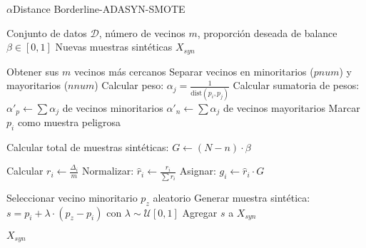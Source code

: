 \begin{algorithm}[H]
\caption{$\alpha$Distance Borderline-ADASYN-SMOTE}
\begin{algorithmic}[1]
\Require Conjunto de datos $\mathcal{D}$, número de vecinos $m$, proporción deseada de balance $\beta \in [0, 1]$
\Ensure Nuevas muestras sintéticas $X_{syn}$

    \State Obtener sus $m$ vecinos más cercanos
    \State Separar vecinos en minoritarios ($pnum$) y mayoritarios ($nnum$)
        \State Calcular peso: $\alpha_j = \frac{1}{\text{dist}(p_i, p_j)}$
    \EndFor
    \State Calcular sumatoria de pesos:
    \State \hspace{1em} $\alpha'_p \gets \sum \alpha_j$ de vecinos minoritarios
    \State \hspace{1em} $\alpha'_n \gets \sum \alpha_j$ de vecinos mayoritarios
        \State Marcar $p_i$ como muestra peligrosa
    \EndIf
\EndFor

\State Calcular total de muestras sintéticas: $G \gets (N - n) \cdot \beta$

    \State Calcular $r_i \gets \frac{\Delta_i}{m}$
    \State Normalizar: $\hat{r}_i \gets \frac{r_i}{\sum r_i}$
    \State Asignar: $g_i \gets \hat{r}_i \cdot G$
\EndFor

        \State Seleccionar vecino minoritario $p_z$ aleatorio
        \State Generar muestra sintética: $s = p_i + \lambda \cdot (p_z - p_i)$ con $\lambda \sim \mathcal{U}[0, 1]$
        \State Agregar $s$ a $X_{syn}$
    \EndFor
\EndFor

\State \Return $X_{syn}$
\end{algorithmic}
\end{algorithm}
